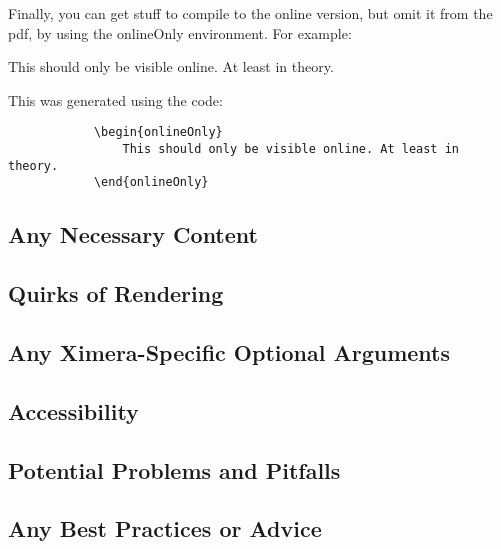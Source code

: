 \documentclass{ximera}
\begin{document}
        Finally, you can get stuff to compile to the online version, but omit it from the pdf, by using the onlineOnly environment. For example:
        
        \begin{onlineOnly}
            This should only be visible online. At least in theory.
        \end{onlineOnly}
        
        This was generated using the code:
        
        \begin{verbatim}
            \begin{onlineOnly}
                This should only be visible online. At least in theory.
            \end{onlineOnly}
        \end{verbatim}
    
    \subsection*{Any Necessary Content}
        
        
        
    \subsection*{Quirks of Rendering}
        
        
        
    \subsection*{Any Ximera-Specific Optional Arguments}
        
        
        
    \subsection*{Accessibility}
        
        
        
    \subsection*{Potential Problems and Pitfalls}
        
        
        
    \subsection*{Any Best Practices or Advice}
        
        
        
\end{document}
